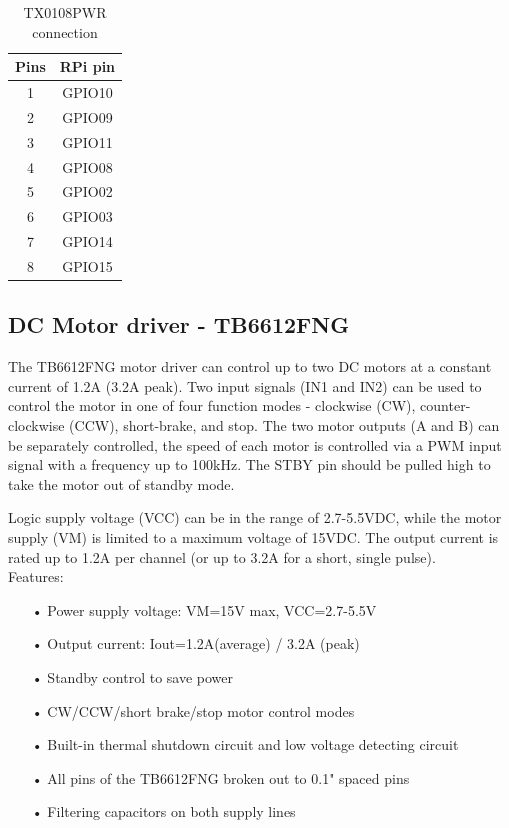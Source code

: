 \documentclass[
12pt, %
a4paper, %
oneside, %
headinclude,footinclude, %
BCOR5mm, %
table,
]{scrartcl}
\begin{document}
\begin{table}[H]
\centering
\begin{tabular}{|cc|}
\hline
Pins & RPi pin \\
\hline
1  & GPIO10 \\
2  & GPIO09 \\
3  & GPIO11 \\
4  & GPIO08 \\
5  & GPIO02 \\
6  & GPIO03 \\
7  & GPIO14 \\
8  & GPIO15 \\
\hline
\end{tabular}
\label{tab:label}
\caption{TX0108PWR connection}
\end{table}
\subsection {DC Motor driver - TB6612FNG}
The TB6612FNG motor driver can control up to two DC motors at a constant current of 1.2A (3.2A peak). Two input signals (IN1 and IN2) can be used to control the motor in one of four function modes - clockwise (CW), counter-clockwise (CCW), short-brake, and stop. The two motor outputs (A and B) can be separately controlled, the speed of each motor is controlled via a PWM input signal with a frequency up to 100kHz. The STBY pin should be pulled high to take the motor out of standby mode.

Logic supply voltage (VCC) can be in the range of 2.7-5.5VDC, while the motor supply (VM) is limited to a maximum voltage of 15VDC. The output current is rated up to 1.2A per channel (or up to 3.2A for a short, single pulse).\\

Features:
\begin{itemize}
\item[•] Power supply voltage: VM=15V max, VCC=2.7-5.5V
\item[•] Output current: Iout=1.2A(average) / 3.2A (peak)
\item[•] Standby control to save power
\item[•] CW/CCW/short brake/stop motor control modes
\item[•] Built-in thermal shutdown circuit and low voltage detecting circuit
\item[•] All pins of the TB6612FNG broken out to 0.1" spaced pins
\item[•] Filtering capacitors on both supply lines
\end{itemize}
\end{document}
